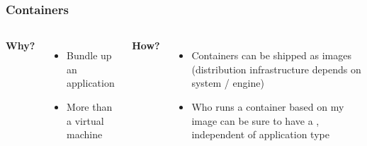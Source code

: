 \begin{frame}
	\frametitle{Containers}
	\begin{columns}
			\textbf{\Large Why?}
			\begin{itemize}
				\item Bundle up an application 
				\item More  than a virtual machine
			\end{itemize}
		
			\vspace{.25cm}\textbf{\Large How?}
			\begin{itemize}
				\item Containers can be shipped as images (distribution infrastructure depends on system / engine)
				\item Who runs a container based on my image can be sure to have a , independent of application type
			\end{itemize}
			
	\end{columns}
\end{frame}

